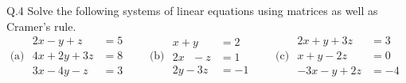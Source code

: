 \begin{question}{Q.4}
Solve the following systems of linear equations using matrices as well as
Cramer's rule.
\[
\text{(a) }
\begin{aligned}
2x-y+z&=5\\ 4x+2y+3z&=8\\ 3x-4y-z&=3
\end{aligned}
\qquad
\text{(b) }
\begin{aligned}
x+y\ \ \ &=2\\ 2x\ \ \ -z&=1\\ 2y-3z&=-1
\end{aligned}
\qquad
\text{(c) }
\begin{aligned}
2x+y+3z&=3\\ x+y-2z&=0\\ -3x-y+2z&=-4
\end{aligned}
\]
\end{question}

